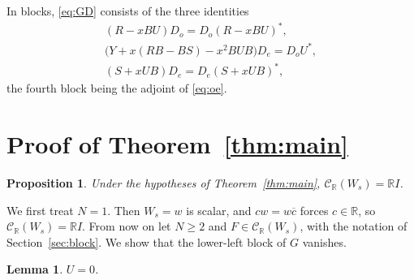 \documentclass[11pt]{amsart}
\newtheorem{proposition}[theorem]{Proposition}
\newtheorem{lemma}[theorem]{Lemma}
\theoremstyle{definition}
\theoremstyle{remark}
\numberwithin{equation}{section}
\newcommand{\R}{\mathbb{R}}
\newcommand{\CR}{\mathcal{C}_{\R}}
\newcommand{\conj}[1]{\overline{#1}}
\begin{document}
In blocks, \eqref{eq:GD} consists of the three identities
\begin{gather}
(R-xBU)D_o=D_o(R-xBU)^*,\label{eq:oo}\\
\bigl(Y+x(RB-BS)-x^2BUB\bigr)D_e=D_oU^*,\label{eq:oe}\\
(S+xUB)D_e=D_e(S+xUB)^*,\label{eq:ee}
\end{gather}
the fourth block being the adjoint of \eqref{eq:oe}.

\section{Proof of Theorem~\ref{thm:main}}\label{sec:proof}

\begin{proposition}\label{prop:CR}
Under the hypotheses of Theorem~\ref{thm:main}, $\CR(W_s)=\R I$.
\end{proposition}

We first treat $N=1$. Then $W_s=w$ is scalar, and $cw=w\conj c$ forces
$c\in\R$, so $\CR(W_s)=\R I$. From now on let $N\ge2$ and
$F\in\CR(W_s)$, with the notation of Section~\ref{sec:block}. We show that
the lower-left block of $G$ vanishes.

\begin{lemma}\label{lem:U}
$U=0$.
\end{lemma}
\end{document}

